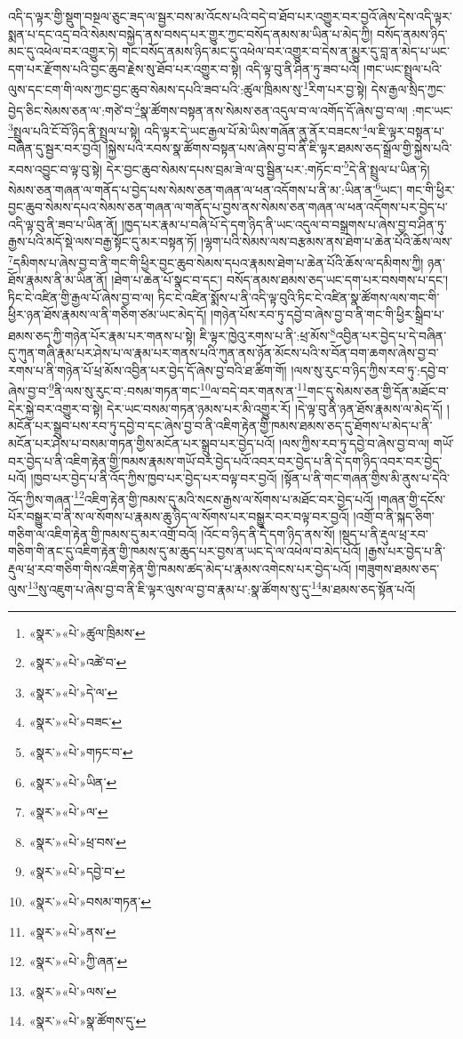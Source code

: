 འདི་ད་ལྟར་གྱི་སྡུག་བསྔལ་ཅུང་ཟད་ལ་སྦྱར་བས་མ་འོངས་པའི་བདེ་བ་ཐོབ་པར་འགྱུར་བར་བྱའོ་ཞེས་དེས་འདི་ལྟར་སྨན་པ་དང་འདྲ་བའི་སེམས་བསྐྱེད་ནས་བསད་པར་གྱུར་ཀྱང་བསོད་ནམས་མ་ཡིན་པ་མེད་ཀྱི། བསོད་ནམས་ཉིད་མང་དུ་འཕེལ་བར་འགྱུར་ཏེ། གང་བསོད་ནམས་ཉིད་མང་དུ་འཕེལ་བར་འགྱུར་བ་དེས་ན་མྱུར་དུ་བླ་ན་མེད་པ་ཡང་དག་པར་རྫོགས་པའི་བྱང་ཆུབ་རྗེས་སུ་ཐོབ་པར་འགྱུར་བ་སྟེ། འདི་ལྟ་བུ་ནི་ཤིན་ཏུ་ཟབ་པའོ། །གང་ཡང་སྤྲུལ་པའི་ལུས་དང་ངག་གི་ལས་ཀྱང་བྱང་ཆུབ་སེམས་དཔའི་ཟབ་པའི་:ཚུལ་ཁྲིམས་སུ་\footnote{«སྣར་»«པེ་»ཚུལ་ཁྲིམས་}རིག་པར་བྱ་སྟེ། དེས་རྒྱལ་སྲིད་ཀྱང་བྱེད་ཅིང་སེམས་ཅན་ལ་:གཙེ་བ་\footnote{«སྣར་»«པེ་»འཚེ་བ་}སྣ་ཚོགས་བསྟན་ནས་སེམས་ཅན་འདུལ་བ་ལ་འགོད་དོ་ཞེས་བྱ་བ་ལ། :གང་ཡང་\footnote{«སྣར་»«པེ་»དེ་ལ་}སྤྲུལ་པའི་ངོ་བོ་ཉིད་ནི་སྤྲུལ་པ་སྟེ། འདི་ལྟར་དེ་ཡང་རྒྱལ་པོ་མེ་ཡིས་གཞོན་ནུ་ནོར་བཟངས་\footnote{«སྣར་»«པེ་»བཟང་}ལ་ཇི་ལྟར་བསྟན་པ་བཞིན་དུ་སྦྱར་བར་བྱའོ། །སྐྱེས་པའི་རབས་སྣ་ཚོགས་བསྟན་པས་ཞེས་བྱ་བ་ནི་ཇི་ལྟར་ཐམས་ཅད་སྒྲོལ་གྱི་སྐྱེས་པའི་རབས་འབྱུང་བ་ལྟ་བུ་སྟེ། དེར་བྱང་ཆུབ་སེམས་དཔས་བྲམ་ཟེ་ལ་བུ་སྦྱིན་པར་:གཏོང་བ་\footnote{«སྣར་»«པེ་»གཏང་བ་}དེ་ནི་སྤྲུལ་པ་ཡིན་ཏེ། སེམས་ཅན་གཞན་ལ་གནོད་པ་བྱེད་པས་སེམས་ཅན་གཞན་ལ་ཕན་འདོགས་པ་ནི་མ་:ཡིན་ན་\footnote{«སྣར་»«པེ་»ཡིན་}ཡང་། གང་གི་ཕྱིར་བྱང་ཆུབ་སེམས་དཔའ་སེམས་ཅན་གཞན་ལ་གནོད་པ་བྱས་ནས་སེམས་ཅན་གཞན་ལ་ཕན་འདོགས་པར་བྱེད་པ་འདི་ལྟ་བུ་ནི་ཟབ་པ་ཡིན་ནོ། །ཁྱད་པར་རྣམ་པ་བཞི་པོ་དེ་དག་ཉིད་ནི་ཡང་འདུལ་བ་བསྒྲགས་པ་ཞེས་བྱ་བ་ཤིན་ཏུ་རྒྱས་པའི་མདོ་སྡེ་ལས་བརྒྱ་སྟོང་དུ་མར་བསྟན་ཏོ། །ལྷག་པའི་སེམས་ལས་བརྩམས་ནས་ཐེག་པ་ཆེན་པོའི་ཆོས་ལས་\footnote{«སྣར་»«པེ་»ལ་}དམིགས་པ་ཞེས་བྱ་བ་ནི་གང་གི་ཕྱིར་བྱང་ཆུབ་སེམས་དཔའ་རྣམས་ཐེག་པ་ཆེན་པོའི་ཆོས་ལ་དམིགས་ཀྱི། ཉན་ཐོས་རྣམས་ནི་མ་ཡིན་ནོ། །ཐེག་པ་ཆེན་པོ་སྣང་བ་དང་། བསོད་ནམས་ཐམས་ཅད་ཡང་དག་པར་བསགས་པ་དང་། ཏིང་ངེ་འཛིན་གྱི་རྒྱལ་པོ་ཞེས་བྱ་བ་ལ། ཏིང་ངེ་འཛིན་སྨོས་པ་ནི་འདི་ལྟ་བུའི་ཏིང་ངེ་འཛིན་སྣ་ཚོགས་ལས་གང་གི་ཕྱིར་ཉན་ཐོས་རྣམས་ལ་ནི་གཅིག་ཙམ་ཡང་མེད་དོ། །གཉེན་པོས་རབ་ཏུ་དབྱེ་བ་ཞེས་བྱ་བ་ནི་གང་གི་ཕྱིར་སྒྲིབ་པ་ཐམས་ཅད་ཀྱི་གཉེན་པོར་རྣམ་པར་གནས་པ་སྟེ། ཇི་ལྟར་ཁྱེའུ་རགས་པ་ནི་:ཕྲ་མོས་\footnote{«སྣར་»«པེ་»ཕྲ་བས་}འབྱིན་པར་བྱེད་པ་དེ་བཞིན་དུ་ཀུན་གཞི་རྣམ་པར་ཤེས་པ་ལ་རྣམ་པར་གནས་པའི་ཀུན་ནས་ཉོན་མོངས་པའི་ས་བོན་བག་ཆགས་ཞེས་བྱ་བ་རགས་པ་ནི་གཉེན་པོ་ཕྲ་མོས་འབྱིན་པར་བྱེད་དོ་ཞེས་བྱ་བའི་ཐ་ཚིག་གོ། །ལས་སུ་རུང་བ་ཉིད་ཀྱིས་རབ་ཏུ་:དབྱེ་བ་ཞེས་བྱ་བ་\footnote{«སྣར་»«པེ་»དབྱེ་བ་}ནི་ལས་སུ་རུང་བ་:བསམ་གཏན་གང་\footnote{«སྣར་»«པེ་»བསམ་གཏན་}ལ་བདེ་བར་གནས་ན་\footnote{«སྣར་»«པེ་»ནས་}གང་དུ་སེམས་ཅན་གྱི་དོན་མཐོང་བ་དེར་སྐྱེ་བར་འགྱུར་བ་སྟེ། དེར་ཡང་བསམ་གཏན་ཉམས་པར་མི་འགྱུར་རོ། །དེ་ལྟ་བུ་ནི་ཉན་ཐོས་རྣམས་ལ་མེད་དོ། །མངོན་པར་སྒྲུབ་པས་རབ་ཏུ་དབྱེ་བ་དང་ཞེས་བྱ་བ་ནི་འཇིག་རྟེན་གྱི་ཁམས་ཐམས་ཅད་དུ་ཐོགས་པ་མེད་པ་ནི་མངོན་པར་ཤེས་པ་བསམ་གཏན་གྱིས་མངོན་པར་སྒྲུབ་པར་བྱེད་པའོ། །ལས་ཀྱིས་རབ་ཏུ་དབྱེ་བ་ཞེས་བྱ་བ་ལ། གཡོ་བར་བྱེད་པ་ནི་འཇིག་རྟེན་གྱི་ཁམས་རྣམས་གཡོ་བར་བྱེད་པའོ་འབར་བར་བྱེད་པ་ནི་དེ་དག་ཉིད་འབར་བར་བྱེད་པའོ། །ཁྱབ་པར་བྱེད་པ་ནི་འོད་ཀྱིས་ཁྱབ་པར་བྱེད་པར་བལྟ་བར་བྱའོ། །སྟོན་པ་ནི་གང་གཞན་གྱིས་མི་ནུས་པ་དེའི་འོད་ཀྱིས་གཞན་\footnote{«སྣར་»«པེ་»ཀྱི་ཞན་}འཇིག་རྟེན་གྱི་ཁམས་དུ་མའི་སངས་རྒྱས་ལ་སོགས་པ་མཐོང་བར་བྱེད་པའོ། །གཞན་གྱི་དངོས་པོར་བསྒྱུར་བ་ནི་ས་ལ་སོགས་པ་རྣམས་ཆུ་ཉིད་ལ་སོགས་པར་བསྒྱུར་བར་བལྟ་བར་བྱའོ། །འགྲོ་བ་ནི་སྐད་ཅིག་གཅིག་ལ་འཇིག་རྟེན་གྱི་ཁམས་དུ་མར་འགྲོ་བའོ། །འོང་བ་ཉིད་ནི་དེ་དག་ཉིད་ནས་སོ། །སྡུད་པ་ནི་རྡུལ་ཕྲ་རབ་གཅིག་གི་ནང་དུ་འཇིག་རྟེན་གྱི་ཁམས་དུ་མ་ཆུད་པར་བྱས་ན་ཡང་དེ་ལ་འཕེལ་བ་མེད་པའོ། །རྒྱས་པར་བྱེད་པ་ནི་རྡུལ་ཕྲ་རབ་གཅིག་གིས་འཇིག་རྟེན་གྱི་ཁམས་ཚད་མེད་པ་རྣམས་འགེངས་པར་བྱེད་པའོ། །གཟུགས་ཐམས་ཅད་ལུས་\footnote{«སྣར་»«པེ་»ལས་}སུ་འཇུག་པ་ཞེས་བྱ་བ་ནི་ཇི་ལྟར་ལུས་ལ་བྱ་བ་རྣམ་པ་:སྣ་ཚོགས་སུ་དུ་\footnote{«སྣར་»«པེ་»སྣ་ཚོགས་དུ་}མ་ཐམས་ཅད་སྟོན་པའོ། 